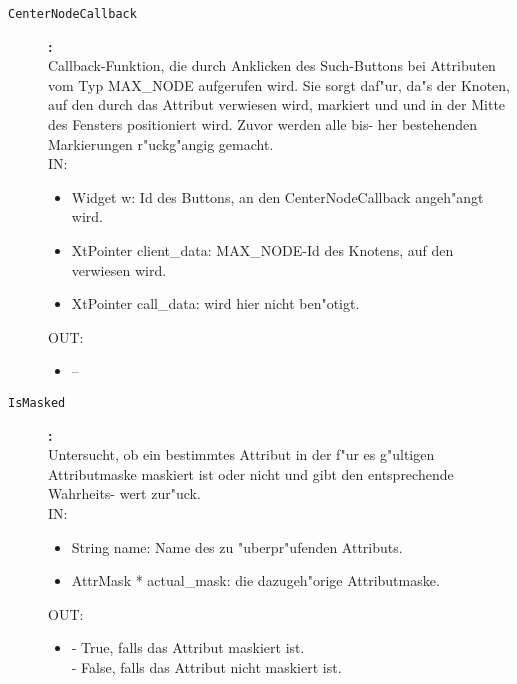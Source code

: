 \begin{description}
\item[\tt CenterNodeCallback]{\bf :\\}
Callback-Funktion, die durch Anklicken des Such-Buttons bei Attributen vom Typ MAX\_NODE aufgerufen wird. Sie sorgt daf"ur, da"s der Knoten, auf den durch das Attribut verwiesen wird, markiert und und in der Mitte des Fensters positioniert wird. Zuvor werden alle bis- her bestehenden Markierungen r"uckg"angig gemacht. \\
IN:
\begin{itemize}
   \item Widget w:              Id des Buttons, an den CenterNodeCallback angeh"angt wird. \item XtPointer client\_data: MAX\_NODE-Id des Knotens, auf den verwiesen wird. \item XtPointer call\_data:   wird hier nicht ben"otigt.
\end{itemize}
OUT:
\begin{itemize}
   \item --
\end{itemize}

\item[\tt IsMasked]{\bf :\\}
Untersucht, ob ein bestimmtes Attribut in der f"ur es g"ultigen Attributmaske maskiert ist oder nicht und gibt den entsprechende Wahrheits- wert zur"uck. \\
IN:
\begin{itemize}
   \item String name:            Name des zu "uberpr"ufenden Attributs. \item AttrMask * actual\_mask: die dazugeh"orige Attributmaske.
\end{itemize}
OUT:
\begin{itemize}
   \item - True, falls das Attribut maskiert ist.\\
         - False, falls das Attribut nicht maskiert ist.
\end{itemize}


\end{description}
